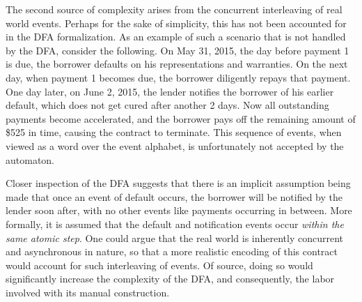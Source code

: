 \documentclass{article}
\begin{document}



The second source of complexity arises from the concurrent interleaving
of real world events.
Perhaps for the sake of simplicity, this has not been accounted for in the DFA
formalization.
As an example of such a scenario that is not handled by the DFA, consider the
following.
On May 31, 2015, the day before payment 1 is due, the borrower defaults on his
representations and warranties.
On the next day, when payment 1 becomes due, the borrower diligently
repays that payment.
One day later, on June 2, 2015, the lender notifies the borrower of his
earlier default, which does not get cured after another 2 days.
Now all outstanding payments become accelerated, and the borrower pays off
the remaining amount of \$525 in time, causing the contract to terminate.
This sequence of events, when viewed as a word over the event alphabet, is
unfortunately not accepted by the automaton.

Closer inspection of the DFA suggests that there is an
implicit assumption being made that once an event of default occurs,
the borrower will be notified by the lender soon after, with no other events
like payments occurring in between.
More formally, it is assumed that the default and notification events occur
\textit{within the same atomic step}.
One could argue that the real world is inherently concurrent and asynchronous
in nature, so that a more realistic encoding of this contract would
account for such interleaving of events.
Of source, doing so would significantly increase the complexity of the DFA,
and consequently, the labor involved with its manual construction.

\end{document}
